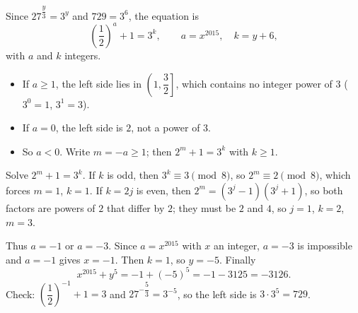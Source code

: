 Since $27^{\dfrac{y}{3}}=3^y$ and $729=3^6$, the equation is
\[
\left(\dfrac{1}{2}\right)^{a}+1=3^{k},\qquad a=x^{2015},\quad k=y+6,
\]
with $a$ and $k$ integers.
\begin{itemize}
\item If $a\ge1$, the left side lies in $\left(1,\dfrac{3}{2}\right]$, which contains no integer power of $3$ ($3^0=1$, $3^1=3$).
\item If $a=0$, the left side is $2$, not a power of $3$.
\item So $a<0$. Write $m=-a\ge1$; then $2^m+1=3^k$ with $k\ge1$.
\end{itemize}
Solve $2^m+1=3^k$. If $k$ is odd, then $3^k\equiv3\pmod 8$, so $2^m\equiv2\pmod8$, which forces $m=1$, $k=1$. If $k=2j$ is even, then $2^m=(3^j-1)(3^j+1)$, so both factors are powers of $2$ that differ by $2$; they must be $2$ and $4$, so $j=1$, $k=2$, $m=3$.

Thus $a=-1$ or $a=-3$. Since $a=x^{2015}$ with $x$ an integer, $a=-3$ is impossible and $a=-1$ gives $x=-1$. Then $k=1$, so $y=-5$. Finally
\[
x^{2015}+y^5=-1+(-5)^5=-1-3125=\boxed{-3126}.
\]
Check: $\left(\dfrac{1}{2}\right)^{-1}+1=3$ and $27^{-\dfrac{5}{3}}=3^{-5}$, so the left side is $3\cdot3^5=729$.
